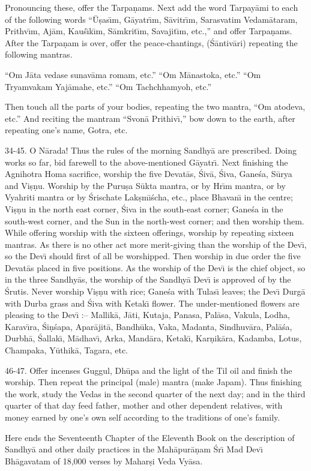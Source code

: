 Pronouncing these, offer the Tarpa\d{n}ams. Next add the word Tarpay\=ami to each of the following words ``\=U\d{s}as\={\i}m, G\=ayatr\={\i}m, S\=avitr\={\i}m, Sarasvatim Vedam\=ataram, Prithv\={\i}m, Aj\=am, Kau\'s\={\i}k\={\i}m, S\=amkrit\={\i}m, Savajit\={\i}m, etc.,'' and offer Tarpa\d{n}ams. After the Tarpa\d{n}am is over, offer the peace-chantings, (\'S\=antiv\=ari) repeating the following mantras.

``Om J\=ata vedase sunav\=ama romam, etc.''
``Om M\=anastoka, etc.''
``Om Tryamvakam Yaj\=amahe, etc.''
``Om Tachchhamyoh, etc.''

Then touch all the parts of your bodies, repeating the two mantra, ``Om atodeva, etc.'' And reciting the mantram ``Svon\=a Prithiv\={\i},'' bow down to the earth, after repeating one's name, Gotra, etc.

34-45. O N\=arada! Thus the rules of the morning Sandhy\=a are prescribed. Doing works so far, bid farewell to the above-mentioned G\=ayatr\={\i}. Next finishing the Agnihotra Homa sacrifice, worship the five Devat\=as, \'Siv\=a, \'Siva, Gane\'sa, S\=urya and Vi\d{s}\d{n}u. Worship by the Puru\d{s}a S\=ukta mantra, or by Hr\={\i}m mantra, or by Vyahriti mantra or by \'Srischate Lak\d{s}m\={\i}\'scha, etc., place Bhavan\={\i} in the centre; Vi\d{s}\d{n}u in the north east corner, \'Siva in the south-east corner; Gane\'sa in the south-west corner, and the Sun in the north-west corner; and then worship them. While offering worship with the sixteen offerings, worship by repeating sixteen mantras. As there is no other act more merit-giving than the worship of the Dev\={\i}, so the Dev\={\i} should first of all be worshipped. Then worship in due order the five Devat\=as placed in five positions. As the worship of the Dev\={\i} is the chief object, so in the three Sandhy\=as, the worship of the Sandhy\=a Dev\={\i} is approved of by the \'Srutis. Never worship Vi\d{s}\d{n}u with rice; Gane\'sa with Tulas\={\i} leaves; the Dev\={\i} Durg\=a with Durba grass and \'Siva with Ketak\={\i} flower. The under-mentioned flowers are pleasing to the Dev\={\i} :-- Mallik\=a, J\=ati, Kutaja, Panasa, Pal\=asa, Vakula, Lodha, Karav\={\i}ra, \'Si\d{n}\'sapa, Apar\=ajit\=a, Bandh\=uka, Vaka, Madanta, Sindhuv\=ara, Pal\=a\'sa, Durbh\=a, \'Sallak\={\i}, M\=adhav\={\i}, Arka, Mand\=ara, Ketak\={\i}, Kar\d{n}ik\=ara, Kadamba, Lotus, Champaka, Y\=uthik\=a, Tagara, etc.

46-47. Offer incenses Guggul, Dh\=upa and the light of the Til oil and finish the worship. Then repeat the principal (male) mantra (make Japam). Thus finishing the work, study the Vedas in the second quarter of the next day; and in the third quarter of that day feed father, mother and other dependent relatives, with money earned by one's own self according to the traditions of one's family.

Here ends the Seventeenth Chapter of the Eleventh Book on the description of Sandhy\=a and other daily practices in the Mah\=apur\=a\d{n}am \'Sr\={\i} Mad Dev\={\i} Bh\=agavatam of 18,000 verses by Mahar\d{s}i Veda Vy\=asa.



